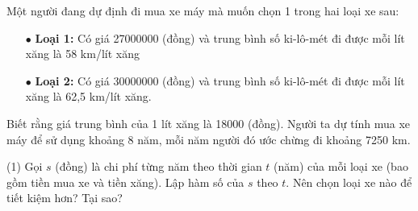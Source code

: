 \begin{bt}
	Một người đang dự định đi mua xe máy mà muốn chọn 1 trong hai loại xe sau:
	\begin{itemize}
		\item [$\bullet$] \textbf{Loại 1:} Có giá 27000000 (đồng) và trung bình số ki-lô-mét đi được mỗi lít xăng là 58 km/lít xăng
		\item [$\bullet$] \textbf{Loại 2:} Có giá 30000000 (đồng) và trung bình số ki-lô-mét đi được mỗi lít xăng là 62,5 km/lít xăng.
	\end{itemize}
	Biết rằng giá trung bình của 1 lít xăng là 18000 (đồng). Người ta dự tính mua xe máy để sử dụng khoảng 8 năm, mỗi năm người đó ước chừng đi khoảng 7250 km.
	\begin{tasks}(1)
		\task Gọi $s$ (đồng) là chi phí từng năm theo thời gian $t$ (năm) của mỗi loại xe (bao gồm tiền mua xe và tiền xăng). Lập hàm số của $s$ theo $t$.
		\task Nên chọn loại xe nào để tiết kiệm hơn? Tại sao?
	\end{tasks}
\end{bt}

